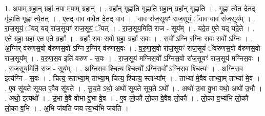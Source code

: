 \documentclass[17pt]{extarticle}
\begin{document}
1. अ॒पाम् ग्रहा॒न् ग्रहा॑ न॒पा म॒पाम् ग्रहान्॑ । . ग्रहा᳚न् गृह्णाति गृह्णाति॒ ग्रहा॒न् ग्रहा᳚न् गृह्णाति । . गृ॒ह्णा॒ त्ये॒त दे॒तद् गृ॑ह्णाति गृह्णा त्ये॒तत् । . ए॒तद् वाव वावैत दे॒तद् वाव । . वाव रा॑ज॒सूयꣳ॑ राज॒सूयं॒ ॅवाव वाव रा॑ज॒सूय᳚म् । . रा॒ज॒सूयं॒ ॅयद् यद् रा॑ज॒सूयꣳ॑ राज॒सूयं॒ ॅयत् । . रा॒ज॒सूय॒मिति॑ राज - सूय᳚म् । . यदे॒त ए॒ते यद् यदे॒ते । . ए॒ते ग्रहा॒ ग्रहा॑ ए॒त ए॒ते ग्रहाः᳚ । . ग्रहाः᳚ स॒वः स॒वो ग्रहा॒ ग्रहाः᳚ स॒वः । . स॒वो᳚ ऽग्नि र॒ग्निः स॒वः स॒वो᳚ ऽग्निः । . अ॒ग्निर् व॑रुणस॒वो व॑रुणस॒वो᳚ ऽग्नि र॒ग्निर् व॑रुणस॒वः । . व॒रु॒ण॒स॒वो रा॑ज॒सूयꣳ॑ राज॒सूयं॑ ॅवरुणस॒वो व॑रुणस॒वो रा॑ज॒सूय᳚म् । . व॒रु॒ण॒स॒व इति॑ वरुण - स॒वः । . रा॒ज॒सूय॑ मग्निस॒वो᳚ ऽग्निस॒वो रा॑ज॒सूयꣳ॑ राज॒सूय॑ मग्निस॒वः । . रा॒ज॒सूय॒मिति॑ राज - सूय᳚म् । . अ॒ग्नि॒स॒व श्चित्य॒ श्चित्यो᳚ ऽग्निस॒वो᳚ ऽग्निस॒व श्चित्यः॑ । . अ॒ग्नि॒स॒व इत्य॑ग्नि - स॒वः । . चित्य॒ स्ताभ्या॒म् ताभ्या॒म् चित्य॒ श्चित्य॒ स्ताभ्या᳚म् । . ताभ्या॑ मे॒वैव ताभ्या॒म् ताभ्या॑ मे॒व । . ए॒व सू॑यते सूयत ए॒वैव सू॑यते । . सू॒य॒ते ऽथो॒ अथो॑ सूयते सूय॒ते ऽथो᳚ । . अथो॑ उ॒भा वु॒भा वथो॒ अथो॑ उ॒भौ । . अथो॒ इत्यथो᳚ । . उ॒भा वे॒वै वोभा वु॒भा वे॒व । . ए॒व लो॒कौ लो॒का वे॒वैव लो॒कौ । . लो॒का व॒भ्य॑भि लो॒कौ लो॒का व॒भि । . अ॒भि ज॑यति जय त्य॒भ्य॑भि ज॑यति । \newline
\end{document}
